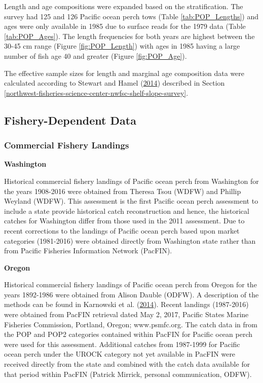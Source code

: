 \documentclass[12pt,]{article}
\begin{document}
Length and age compositions were expanded based on the stratification.
The survey had 125 and 126 Pacific ocean perch tows (Table
\ref{tab:POP_Lengths}) and ages were only available in 1985 due to
surface reads for the 1979 data (Table \ref{tab:POP_Ages}). The length
frequencies for both years are highest between the 30-45 cm range
(Figure \ref{fig:POP_Length}) with ages in 1985 having a large number of
fish age 40 and greater (Figure \ref{fig:POP_Age}).

The effective sample sizes for length and marginal age composition data
were calculated according to Stewart and Hamel
(\protect\hyperlink{ref-stewart_bootstrapping_2014}{2014}) described in
Section
\ref{northwest-fisheries-science-center-nwfsc-shelf-slope-survey}.

\subsection{Fishery-Dependent Data}\label{fishery-dependent-data}

\subsubsection{Commercial Fishery
Landings}\label{commercial-fishery-landings}

\textbf{Washington}

Historical commercial fishery landings of Pacific ocean perch from
Washington for the years 1908-2016 were obtained from Theresa Tsou
(WDFW) and Phillip Weyland (WDFW). This assessment is the first Pacific
ocean perch assessment to include a state provide historical catch
reconstruction and hence, the historical catches for Washington differ
from those used in the 2011 assessment. Due to recent corrections to the
landings of Pacific ocean perch based upon market categories (1981-2016)
were obtained directly from Washington state rather than from Pacific
Fisheries Information Network (PacFIN).

\textbf{Oregon}

Historical commercial fishery landings of Pacific ocean perch from
Oregon for the years 1892-1986 were obtained from Alison Dauble (ODFW).
A description of the methods can be found in Karnowski et al.
(\protect\hyperlink{ref-karnowski_historical_2014}{2014}). Recent
landings (1987-2016) were obtained from PacFIN retrieval dated May 2,
2017, Pacific States Marine Fisheries Commission, Portland, Oregon;
www.psmfc.org. The catch data in from the POP and POP2 categories
contained within PacFIN for Pacific ocean perch were used for this
assessment. Additional catches from 1987-1999 for Pacific ocean perch
under the UROCK category not yet available in PacFIN were received
directly from the state and combined with the catch data available for
that period within PacFIN (Patrick Mirrick, personal communication,
ODFW).
\end{document}
